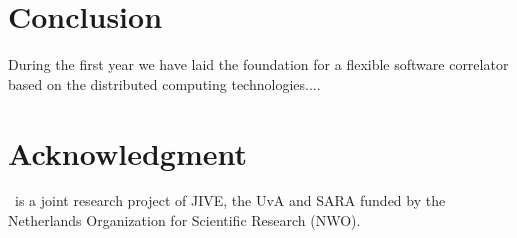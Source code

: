 \section{Conclusion}
During the first year we have laid the foundation for a flexible
software correlator based on the distributed computing
technologies....

\section{Acknowledgment}
\scarie\ is a joint research project of JIVE, the UvA and SARA funded by the Netherlands Organization for Scientific Research (NWO). 


